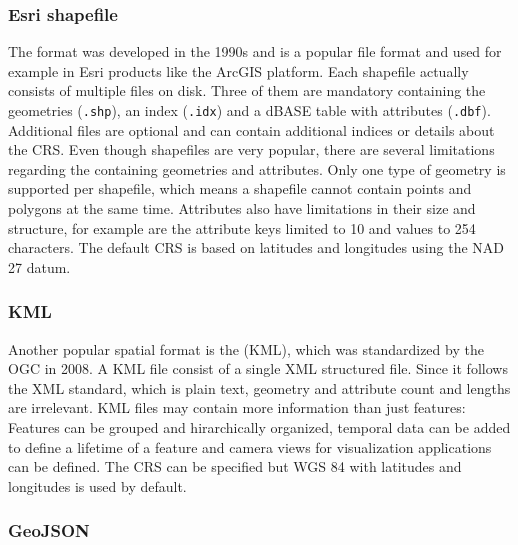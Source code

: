 		\subsubsection{Esri shapefile}
		\label{subsubsec:shapefile}
		
			The  format was developed in the 1990s and is a popular file format and used for example in Esri products like the ArcGIS platform.
			Each shapefile actually consists of multiple files on disk\cite{esri-shapefile-file-ext-spec}.
			Three of them are mandatory containing the geometries (\texttt{.shp}), an index (\texttt{.idx}) and a dBASE table with attributes (\texttt{.dbf}).
			Additional files are optional and can contain additional indices or details about the CRS.
			Even though shapefiles are very popular\cite[356]{spatial-file-formats-trends}, there are several limitations regarding the containing geometries and attributes.
			Only one type of geometry is supported per shapefile, which means a shapefile cannot contain points and polygons at the same time\cite[4]{esri-shapefile-spec}.
			Attributes also have limitations in their size and structure, for example are the attribute keys limited to 10 and values to 254 characters\cite{esri-shapefile-limitations}.
			The default CRS is based on latitudes and longitudes using the NAD 27 datum\cite{esri-shapefile-coordinate-system}.
			
		\subsubsection{KML}
		
			Another popular spatial format is the  (KML), which was standardized by the OGC in 2008\cite{ogc-kml-2.2}.
			A KML file consist of a single XML structured file.
			Since it follows the XML standard, which is plain text, geometry and attribute count and lengths are irrelevant.
			KML files may contain more information than just features:
			Features can be grouped and hirarchically organized, temporal data can be added to define a lifetime of a feature and camera views for visualization applications can be defined\cite{ogc-kml-2.3}.
			The CRS can be specified but WGS 84 with latitudes and longitudes is used by default.
		
		\subsubsection{GeoJSON}
		\label{subsubsec:geojson}
		
